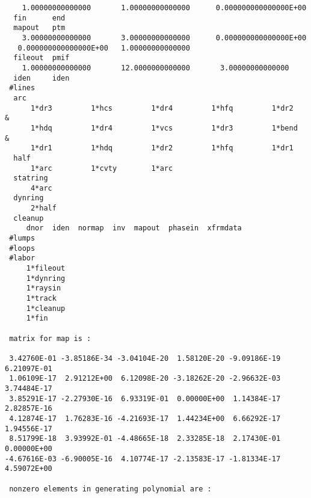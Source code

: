 {\begin{verbatim}
    1.00000000000000       1.00000000000000      0.000000000000000E+00
  fin      end
  mapout   ptm
    3.00000000000000       3.00000000000000      0.000000000000000E+00
   0.000000000000000E+00   1.00000000000000
  fileout  pmif
    1.00000000000000       12.0000000000000       3.00000000000000
  iden     iden
 #lines
  arc
      1*dr3         1*hcs         1*dr4         1*hfq         1*dr2      &
      1*hdq         1*dr4         1*vcs         1*dr3         1*bend     &
      1*dr1         1*hdq         1*dr2         1*hfq         1*dr1
  half
      1*arc         1*cvty        1*arc
  statring
      4*arc
  dynring
      2*half
  cleanup
     dnor  iden  normap  inv  mapout  phasein  xfrmdata
 #lumps
 #loops
 #labor
     1*fileout
     1*dynring
     1*raysin
     1*track
     1*cleanup
     1*fin

 matrix for map is :

 3.42760E-01 -3.85186E-34 -3.04104E-20  1.58120E-20 -9.09186E-19  6.21097E-01
 1.06109E-17  2.91212E+00  6.12098E-20 -3.18262E-20 -2.96632E-03  3.74484E-17
 3.85291E-17 -2.27930E-16  6.93319E-01  0.00000E+00  1.14384E-17  2.82857E-16
 4.12874E-17  1.76283E-16 -4.21693E-17  1.44234E+00  6.66292E-17  1.94556E-17
 8.51799E-18  3.93992E-01 -4.48665E-18  2.33285E-18  2.17430E-01  0.00000E+00
-4.67616E-03 -6.90005E-16  4.10774E-17 -2.13583E-17 -1.81334E-17  4.59072E+00

 nonzero elements in generating polynomial are :


\end{verbatim}}
